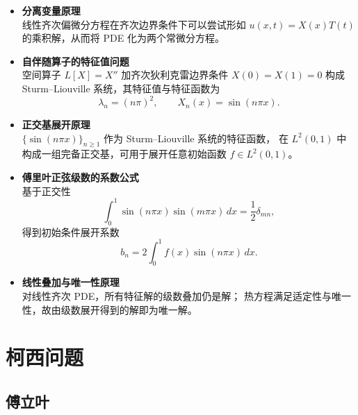 \begin{dxtips}
 \begin{itemize}
  \item \textbf{分离变量原理}\\
  线性齐次偏微分方程在齐次边界条件下可以尝试形如
  $u(x,t)=X(x)T(t)$ 的乘积解，从而将 PDE 化为两个常微分方程。

  \item \textbf{自伴随算子的特征值问题}\\
  空间算子 $L[X]=X''$ 加齐次狄利克雷边界条件 $X(0)=X(1)=0$ 构成
  Sturm–Liouville 系统，其特征值与特征函数为
  \[
    \lambda_n=(n\pi)^2,\qquad X_n(x)=\sin(n\pi x).
  \]

  \item \textbf{正交基展开原理}\\
  $\{\sin(n\pi x)\}_{n\ge1}$ 作为 Sturm–Liouville 系统的特征函数，
  在 $L^2(0,1)$ 中构成一组完备正交基，可用于展开任意初始函数
  $f\in L^2(0,1)$。

  \item \textbf{傅里叶正弦级数的系数公式}\\
  基于正交性
  \[
    \int_0^1 \sin(n\pi x)\sin(m\pi x)\,dx = \frac12\delta_{mn},
  \]
  得到初始条件展开系数
  \[
    b_n = 2\int_0^1 f(x)\sin(n\pi x)\,dx.
  \]

  \item \textbf{线性叠加与唯一性原理}\\
  对线性齐次 PDE，所有特征解的级数叠加仍是解；
  热方程满足适定性与唯一性，故由级数展开得到的解即为唯一解。

\end{itemize}
\end{dxtips}
\section{柯西问题}
\subsection{傅立叶}

